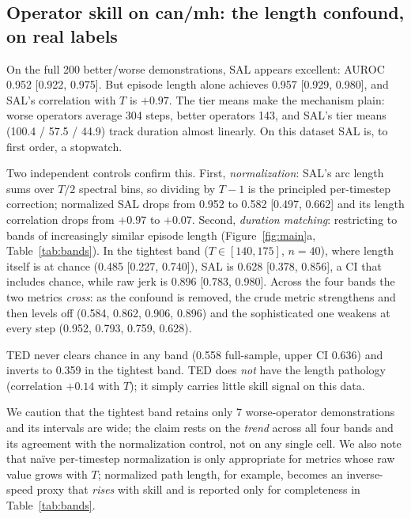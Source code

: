 \documentclass[10pt]{article}
\begin{document}
\subsection{Operator skill on can/mh: the length confound, on real labels}

On the full 200 better/worse demonstrations, SAL appears excellent: AUROC
0.952 [0.922, 0.975]. But episode length alone achieves 0.957 [0.929,
0.980], and SAL's correlation with $T$ is $+0.97$. The tier means make the
mechanism plain: worse operators average 304 steps, better operators 143,
and SAL's tier means (100.4 / 57.5 / 44.9) track duration almost linearly.
On this dataset SAL is, to first order, a stopwatch.

Two independent controls confirm this. First, \emph{normalization}: SAL's
arc length sums over $T/2$ spectral bins, so dividing by $T{-}1$ is the
principled per-timestep correction; normalized SAL drops from 0.952 to 0.582
[0.497, 0.662] and its length correlation drops from $+0.97$ to $+0.07$.
Second, \emph{duration matching}: restricting to bands of increasingly
similar episode length (Figure~\ref{fig:main}a, Table~\ref{tab:bands}). In
the tightest band ($T \in [140,175]$, $n{=}40$), where length itself is at
chance (0.485 [0.227, 0.740]), SAL is 0.628 [0.378, 0.856], a CI that
includes chance, while raw jerk is 0.896 [0.783, 0.980]. Across the four
bands the two metrics \emph{cross}: as the confound is removed, the crude
metric strengthens and then levels off (0.584, 0.862, 0.906, 0.896) and the
sophisticated one weakens at every step (0.952, 0.793, 0.759, 0.628).

TED never clears chance in any band (0.558 full-sample, upper CI 0.636)
and inverts to 0.359 in the tightest band. TED does \emph{not}
have the length pathology (correlation $+0.14$ with $T$); it simply carries
little skill signal on this data.

We caution that the tightest band retains only 7 worse-operator
demonstrations and its intervals are wide; the claim rests on the
\emph{trend} across all four bands and its agreement with the normalization
control, not on any single cell. We also note that na\"ive per-timestep
normalization is only appropriate for metrics whose raw value grows with
$T$; normalized path length, for example, becomes an inverse-speed proxy
that \emph{rises} with skill and is reported only for completeness in
Table~\ref{tab:bands}.
\end{document}
